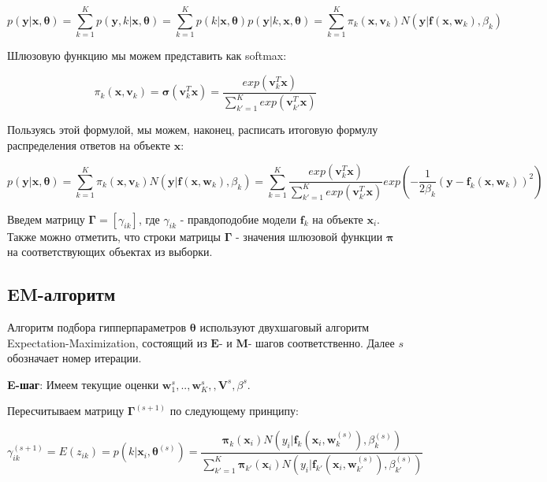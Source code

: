 \documentclass[12pt,twoside]{article}
\begin{document}
$$ p(\mathbf{y} | \mathbf{x}, \boldsymbol{\theta}) = \sum\limits_{k=1}^K p(\mathbf{y}, k | \mathbf{x}, \boldsymbol{\theta}) = 
\sum\limits_{k=1}^K p(k| \mathbf{x}, \boldsymbol{\theta}) p(\mathbf{y}| k, \mathbf{x}, \boldsymbol{\theta}) =
\sum\limits_{k=1}^K \pi_k (\mathbf{x}, \mathbf{v}_k) N(\mathbf{y} | \mathbf{f}(\mathbf{x}, \mathbf{w}_k), \beta_k )
$$

Шлюзовую функцию мы можем представить как softmax:

$$ \pi_k  (\mathbf{x}, \mathbf{v}_k) = \boldsymbol{\sigma} (\mathbf{v}_k^T \mathbf{x}) = \frac{
exp(\mathbf{v}_k^T \mathbf{x}) }{\sum\limits_{k' =1}^{K}exp(\mathbf{v}_{k'}^T \mathbf{x})}$$

Пользуясь этой формулой, мы можем, наконец, расписать итоговую формулу  распределения ответов на объекте $\mathbf{x}$:

$$ p(\mathbf{y} | \mathbf{x}, \boldsymbol{\theta}) = 
\sum\limits_{k=1}^K \pi_k (\mathbf{x}, \mathbf{v}_k) N(\mathbf{y} | \mathbf{f}(\mathbf{x}, \mathbf{w}_k), \beta_k )  =
\sum\limits_{k=1}^{K} \frac{
exp(\mathbf{v}_k^T \mathbf{x}) }{\sum\limits_{k' =1}^{K}exp(\mathbf{v}_{k'}^T \mathbf{x})} exp\left(-\frac{1}{2\beta_k}(\mathbf{y} -
\mathbf{f}_k (\mathbf{x}, \mathbf{w}_k)
 )^2\right)
 $$

Введем матрицу $\boldsymbol{\Gamma} = [\gamma_{ik}]$, где $\gamma_{ik}$ - правдоподобие модели $\mathbf{f}_k$ на объекте $\mathbf{x}_i$. Также можно отметить,  что строки матрицы $\boldsymbol{\Gamma}$ - значения шлюзовой функции $\boldsymbol{\pi}$ на соответствующих объектах из выборки.

\subsection{EM-алгоритм}
Алгоритм подбора гипперпараметров $\boldsymbol{\theta}$ используют двухшаговый алгоритм Expectation-Maximization, состоящий из $\mathbf{E}$- и $\mathbf{M}$- шагов соответственно. Далее $s$ обозначает номер итерации.

\textbf{E-шаг}: Имеем текущие оценки $\mathbf{w}_1^s, .. , \mathbf{w}_K^s, , \mathbf{V}^s, \mathbb{\beta}^s $. 

Пересчитываем матрицу $\boldsymbol{\Gamma}^{(s + 1)}$ по следующему принципу:

$$ \gamma_{ik}^{(s+1)} = E(z_{ik}) = p(k | \mathbf{x}_i, \boldsymbol{\theta}^{(s)}) = 
\frac{\boldsymbol{\pi}_k(\mathbf{x}_i) N(y_i | \mathbf{f}_k(\mathbf{x}_i, \mathbf{w}_k^{(s)}), \beta_k^{(s)})}
{\sum\limits_{k'=1}^K\boldsymbol{\pi}_{k'}(\mathbf{x}_i) N(y_i | \mathbf{f}_{k'}(\mathbf{x}_i, \mathbf{w}_{k'}^{(s)}), \beta_{k'}^{(s)})}$$
\end{document}
